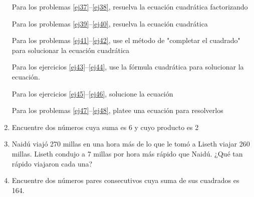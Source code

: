 \documentclass[twoside,letterpaper]{article}
\begin{document}
\begin{multicols}{2}
\begin{enumerate}
Para los problemas \ref{ej37}--\ref{ej38}, resuelva la ecuación cuadrática factorizando
Para los problemas \ref{ej39}--\ref{ej40}, resuelva la ecuación cuadrática
Para los problemas \ref{ej41}--\ref{ej42}, use el método de "completar el cuadrado" para solucionar la ecuación cuadrática
Para los ejercicios \ref{ej43}--\ref{ej44}, use la fórmula cuadrática para solucionar la ecuación.
Para los ejercicios \ref{ej45}--\ref{ej46}, solucione la ecuación
Para los problemas \ref{ej47}--\ref{ej48}, platee una ecuación para resolverlos
\item \label{ej47} Encuentre dos números cuya suma es 6 y cuyo producto es 2
\item Naidú viajó 270 millas en una hora más de lo que le tomó a Liseth viajar 260 millas. Liseth condujo a 7 millas por hora más rápido que Naidú. ¿Qué tan rápido viajaron cada una?
\item \label{ej48} Encuentre dos números pares consecutivos cuya suma de sus cuadrados es 164.

\end{enumerate}
\end{multicols}
\end{document}
